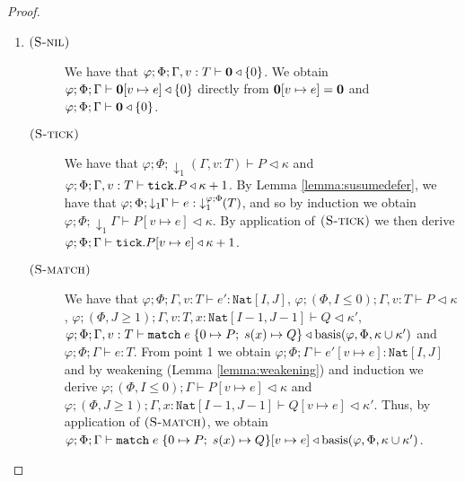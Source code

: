 \begin{lemma}[Substitution]
\begin{proof}
\begin{enumerate}
\begin{description}
%
%
\end{description}
    \item 
\begin{description}
%
\item[$\runa{S-nil}$] We have that $\varphi;\Phi;\Gamma,v:T\vdash \nil \triangleleft \{0\}$. We obtain $\varphi;\Phi;\Gamma\vdash \nil[v\mapsto e] \triangleleft \{0\}$ directly from $\nil[v\mapsto e] = \nil$ and $\varphi;\Phi;\Gamma\vdash \nil \triangleleft \{0\}$.
%
\item[$\runa{S-tick}$] We have that $\varphi;\Phi;\downarrow_1\!\!(\Gamma,v:T)\vdash P \triangleleft \kappa$ and $\varphi;\Phi;\Gamma,v:T\vdash \tick{P} \triangleleft \kappa + 1$. By Lemma \ref{lemma:susumedefer}, we have that $\varphi;\Phi;\downarrow_1\!\!\Gamma\vdash e :\; \susume{T}{\varphi}{\Phi}{1}$, and so by induction we obtain $\varphi;\Phi;\downarrow_1\!\!\Gamma\vdash P[v\mapsto e] \triangleleft \kappa$. By application of $\runa{S-tick}$ we then derive $\varphi;\Phi;\Gamma\vdash \tick{P[v\mapsto e]} \triangleleft \kappa + 1$.
%
\item[$\runa{S-match}$] We have that $\varphi;\Phi;\Gamma,v:T\vdash e' : \texttt{Nat}[I,J]$, $\varphi;(\Phi,I\leq 0);\Gamma,v:T\vdash P \triangleleft \kappa$, $\varphi;(\Phi,J\geq 1);\Gamma,v:T,x:\texttt{Nat}[I-1,J-1]\vdash Q \triangleleft \kappa'$, $\varphi;\Phi;\Gamma,v:T\vdash \match{e}{P}{x}{Q} \triangleleft \text{basis}(\varphi,\Phi,\kappa\cup\kappa')$ and $\varphi;\Phi;\Gamma\vdash e : T$. From point 1 we obtain $\varphi;\Phi;\Gamma\vdash e'[v\mapsto e] : \texttt{Nat}[I,J]$ and by weakening (Lemma \ref{lemma:weakening}) and induction we derive $\varphi;(\Phi,I\leq 0);\Gamma\vdash P[v\mapsto e] \triangleleft \kappa$ and $\varphi;(\Phi,J\geq 1);\Gamma,x:\texttt{Nat}[I-1,J-1]\vdash Q[v\mapsto e] \triangleleft \kappa'$. Thus, by application of $\runa{S-match}$, we obtain $\varphi;\Phi;\Gamma\vdash \match{e}{P}{x}{Q}[v\mapsto e] \triangleleft \text{basis}(\varphi,\Phi,\kappa\cup\kappa')$. 

\end{description}
\end{enumerate}
\end{proof}
\end{lemma}
